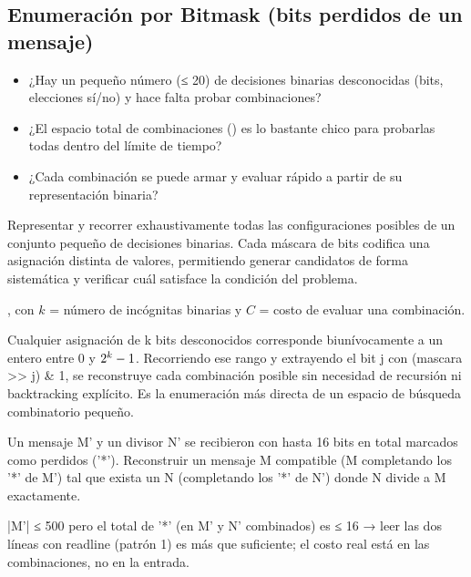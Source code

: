 \subsection{Enumeración por Bitmask (bits perdidos de un mensaje)}
\label{alg:5-2}


\begin{itemize}
\item ¿Hay un pequeño número (≤ \aprox{}20) de decisiones binarias desconocidas (bits, elecciones sí/no) y hace falta probar combinaciones?
\item ¿El espacio total de combinaciones () es lo bastante chico para probarlas todas dentro del límite de tiempo?
\item ¿Cada combinación se puede armar y evaluar rápido a partir de su representación binaria?
\end{itemize}

 Representar y recorrer exhaustivamente todas las configuraciones posibles de un conjunto pequeño de decisiones binarias. Cada máscara de bits codifica una asignación distinta de valores, permitiendo generar candidatos de forma sistemática y verificar cuál satisface la condición del problema.

 , con $k$ = número de incógnitas binarias y $C$ = costo de evaluar una combinación.

 Cualquier asignación de k bits desconocidos corresponde biunívocamente a un entero entre 0 y ${2}^{k}-1$. Recorriendo ese rango y extrayendo el bit j con (mascara \textgreater{}\textgreater{} j) \& 1, se reconstruye cada combinación posible sin necesidad de recursión ni backtracking explícito. Es la enumeración más directa de un espacio de búsqueda combinatorio pequeño.


Un mensaje M' y un divisor N' se recibieron con hasta 16 bits en total marcados como perdidos ('*'). Reconstruir un mensaje M compatible (M completando los '*' de M') tal que exista un N (completando los '*' de N') donde N divide a M exactamente.

 |M'| ≤ 500 pero el total de '*' (en M' y N' combinados) es ≤ 16 → leer las dos líneas con readline (patrón 1) es más que suficiente; el costo real está en las  combinaciones, no en la entrada.


